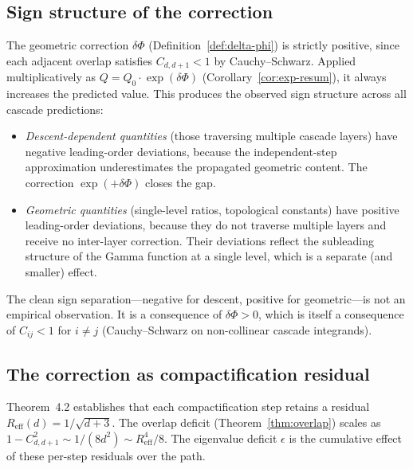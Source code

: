 \documentclass[12pt,a4paper]{article}
\theoremstyle{remark}
\begin{document}

\subsection{Sign structure of the correction}

The geometric correction $\delta\Phi$ (Definition~\ref{def:delta-phi}) is strictly positive, since each adjacent overlap satisfies $C_{d,d+1}<1$ by Cauchy--Schwarz. Applied multiplicatively as $Q = Q_0\cdot\exp(\delta\Phi)$ (Corollary~\ref{cor:exp-resum}), it always increases the predicted value. This produces the observed sign structure across all cascade predictions:

\begin{itemize}[nosep]
\item \emph{Descent-dependent quantities} (those traversing multiple cascade layers) have negative leading-order deviations, because the independent-step approximation underestimates the propagated geometric content. The correction $\exp(+\delta\Phi)$ closes the gap.
\item \emph{Geometric quantities} (single-level ratios, topological constants) have positive leading-order deviations, because they do not traverse multiple layers and receive no inter-layer correction. Their deviations reflect the subleading structure of the Gamma function at a single level, which is a separate (and smaller) effect.
\end{itemize}

The clean sign separation---negative for descent, positive for geometric---is not an empirical observation. It is a consequence of $\delta\Phi > 0$, which is itself a consequence of $C_{ij} < 1$ for $i\neq j$ (Cauchy--Schwarz on non-collinear cascade integrands).

\subsection{The correction as compactification residual}

Theorem~4.2 establishes that each compactification step retains a residual $R_{\mathrm{eff}}(d) = 1/\sqrt{d+3}$. The overlap deficit (Theorem~\ref{thm:overlap}) scales as $1-C_{d,d+1}^2 \sim 1/(8d^2) \sim R_{\mathrm{eff}}^4/8$. The eigenvalue deficit $\epsilon$ is the cumulative effect of these per-step residuals over the path.
\end{document}
